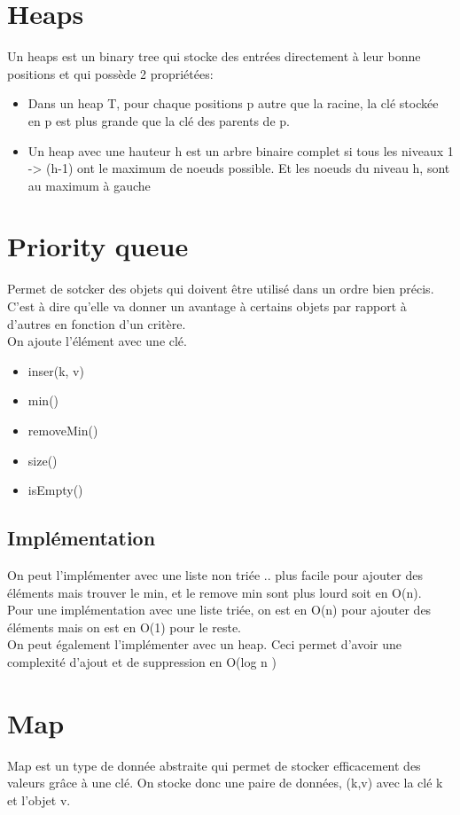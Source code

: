 \documentclass[a4paper]{article}
\begin{document}
\section{Heaps}
Un heaps est un binary tree qui stocke des entrées directement à leur bonne positions et qui possède 2 propriétées:
\begin{itemize}
\item Dans un heap T, pour chaque positions p autre que la racine, la clé stockée en p est plus grande que la clé des parents de p.
\item Un heap avec une hauteur h est un arbre binaire complet si tous les niveaux  1 -> (h-1) ont le maximum de noeuds possible. Et les noeuds du niveau h, sont au maximum à gauche
\end{itemize}

\section{Priority queue}
Permet de sotcker des objets qui doivent être utilisé dans un ordre bien précis. C'est à dire qu'elle va donner un avantage à certains objets par rapport à d'autres en fonction d'un critère.\\
On ajoute l'élément avec une clé.\\

\begin{itemize}
\item inser(k, v)
\item min()
\item removeMin()
\item size()
\item isEmpty()
\end{itemize}

\subsection{Implémentation}
On peut l'implémenter avec une liste non triée .. plus facile pour ajouter des éléments mais trouver le min, et le remove min sont plus lourd soit en O(n).\\

Pour une implémentation avec une liste triée, on est en O(n) pour ajouter des éléments mais on est en O(1) pour le reste.\\

On peut également l'implémenter avec un heap. Ceci permet d'avoir une complexité d'ajout et de suppression en O(log n )

\section{Map}
Map est un type de donnée abstraite qui permet de stocker efficacement des valeurs grâce à une clé. On stocke donc une paire de données, (k,v) avec la clé k et l'objet v.
\end{document}
